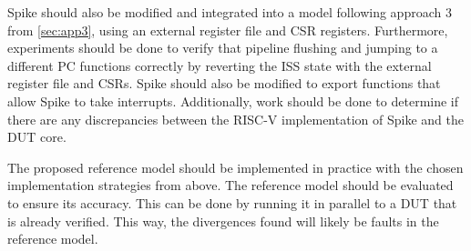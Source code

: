 Spike should also be modified and integrated into a model following approach 3 from \cref{sec:app3}, using an external register file and CSR registers. Furthermore, experiments should be done to verify that pipeline flushing and jumping to a different PC functions correctly by reverting the ISS state with the external register file and CSRs. Spike should also be modified to export functions that allow Spike to take interrupts. Additionally, work should be done to determine if there are any discrepancies between the RISC-V implementation of Spike and the DUT core. 

The proposed reference model should be implemented in practice with the chosen implementation strategies from above. The reference model should be evaluated to ensure its accuracy. This can be done by running it in parallel to a DUT that is already verified. This way, the divergences found will likely be faults in the reference model.